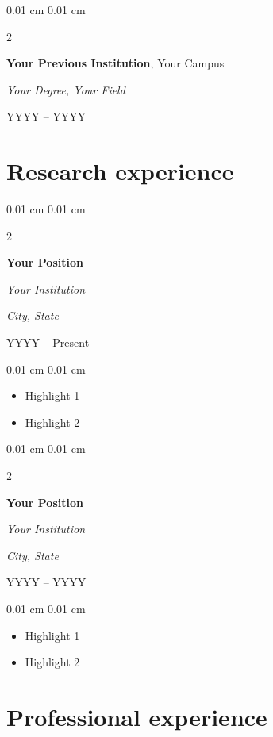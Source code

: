\documentclass[11pt, letterpaper]{article}
\newenvironment{highlights}{
    \begin{itemize}[
        topsep=0.10 cm,
        parsep=0.10 cm,
        partopsep=0pt,
        itemsep=0pt,
        leftmargin=0.4 cm + 10pt
    ]
}{
    \end{itemize}
}
\newenvironment{onecolentry}{
    \begin{adjustwidth}{
        0.01 cm 
    }{
        0.01 cm 
    }
}{
    \end{adjustwidth}
}
\newenvironment{twocolentry}[2][]{
    \onecolentry
    \def\secondColumn{#2}
    \setcolumnwidth{\fill, 3.75 cm}
    \begin{paracol}{2}
}{
    \switchcolumn \raggedleft \secondColumn
    \end{paracol}
    \endonecolentry
}
\begin{document}
        \begin{twocolentry}{

        YYYY – YYYY}
            \textbf{Your Previous Institution}, Your Campus

            \textit{Your Degree, Your Field}
        \end{twocolentry}

    \section{Research experience}

        \begin{twocolentry}{
        \textit{City, State}    
        
        YYYY – Present}
            \textbf{Your Position}
            
            \textit{Your Institution}
        \end{twocolentry}

        \begin{onecolentry}
            \begin{highlights}
                \item Highlight 1
                \item Highlight 2
            \end{highlights}
        \end{onecolentry}        

        \begin{twocolentry}{
            \textit{City, State}    
                
            YYYY – YYYY}
                \textbf{Your Position}
                
                \textit{Your Institution}
            \end{twocolentry}
    
            \begin{onecolentry}
            \begin{highlights}
                    \item Highlight 1
                    \item Highlight 2
                \end{highlights}
            \end{onecolentry}

    \section{Professional experience}
\end{document}
